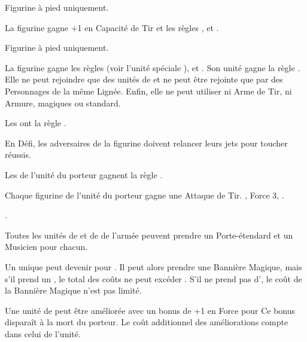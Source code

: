 \begin{multicols}{2}
Figurine à pied uniquement.

La figurine gagne +1 en Capacité de Tir et les règles \scout{}, \masterarcher{} et .

Figurine à pied uniquement.

La figurine gagne les règles \dancesofcenyrn{} (voir l'unité spéciale \bladedancers{}), \immunetopsychology{} et . Son unité gagne la règle \swiftstride{}. Elle ne peut rejoindre que des unités de \bladedancers{} et ne peut être rejointe que par des Personnages de la même Lignée. Enfin, elle ne peut utiliser ni Arme de Tir, ni Armure, magiques ou standard.

\endpricelistNSP
\closearmynewsection

\vspace*{\fill}
\columnbreak

\toctarget{aspectsofnaturetitle}{%
\vspace*{-1.5cm}\section*{}\noindent\begin{center}\hugefontsize\textbf{\antiquefont\expandafter\uppercase\expandafter{\aspectsofnature}}\end{center}
\largefontsize
}

\spaceaftersection{}

Les \aspectsofnature{} ont la règle \oneperarmy{}.

\startpricelistNSP

 En Défi, les adversaires de la figurine doivent relancer leurs jets pour toucher réussis.

 Les \dryads{} de l'unité du porteur gagnent la règle \hatred{}.

 Chaque figurine de l'unité du porteur gagne une Attaque de Tir. , Force 3, .

 .

Toutes les unités de \dryads{} et de \thicketbeasts{} de l'armée peuvent prendre un Porte-étendard et un Musicien pour  chacun.

Un unique \thicketshepherd{} peut devenir \bsb{} pour . Il peut alors prendre une Bannière Magique, mais s'il prend un \aspectofnature{}, le total des coûts ne peut excéder . S'il ne prend pas d'\aspectofnature{}, le coût de la Bannière Magique n'est pas limité.

 Une unité de \thicketbeasts{} peut être améliorée avec un bonus de +1 en Force pour \permodel{} Ce bonus disparaît à la mort du porteur. Le coût additionnel des améliorations compte dans celui de l'unité.

\endpricelistNSP
\closearmynewsection

\vspace*{\fill}
\end{multicols}
